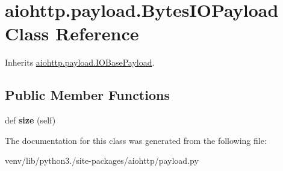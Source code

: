 \hypertarget{classaiohttp_1_1payload_1_1_bytes_i_o_payload}{}\section{aiohttp.\+payload.\+Bytes\+I\+O\+Payload Class Reference}
\label{classaiohttp_1_1payload_1_1_bytes_i_o_payload}


Inherits \hyperlink{classaiohttp_1_1payload_1_1_i_o_base_payload}{aiohttp.\+payload.\+I\+O\+Base\+Payload}.

\subsection*{Public Member Functions}
\begin{DoxyCompactItemize}
\item 
\mbox{\label{classaiohttp_1_1payload_1_1_bytes_i_o_payload_a2812c7c57f795adb6a91c64b15184916}} 
def {\bfseries size} (self)
\end{DoxyCompactItemize}


The documentation for this class was generated from the following file\+:\begin{DoxyCompactItemize}
\item 
venv/lib/python3./site-\/packages/aiohttp/payload.\+py\end{DoxyCompactItemize}
